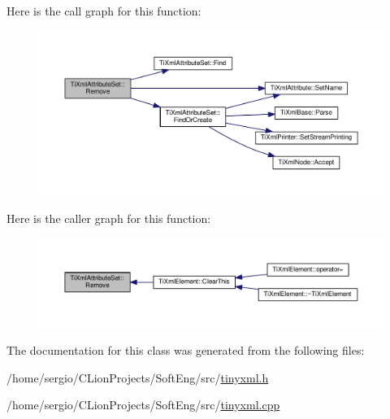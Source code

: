 Here is the call graph for this function\+:\nopagebreak
\begin{figure}[H]
\begin{center}
\leavevmode
\includegraphics[width=350pt]{class_ti_xml_attribute_set_a924a73d071f2573f9060f0be57879c57_cgraph}
\end{center}
\end{figure}
Here is the caller graph for this function\+:\nopagebreak
\begin{figure}[H]
\begin{center}
\leavevmode
\includegraphics[width=350pt]{class_ti_xml_attribute_set_a924a73d071f2573f9060f0be57879c57_icgraph}
\end{center}
\end{figure}


The documentation for this class was generated from the following files\+:\begin{DoxyCompactItemize}
\item 
/home/sergio/\+C\+Lion\+Projects/\+Soft\+Eng/src/\hyperlink{tinyxml_8h}{tinyxml.\+h}\item 
/home/sergio/\+C\+Lion\+Projects/\+Soft\+Eng/src/\hyperlink{tinyxml_8cpp}{tinyxml.\+cpp}\end{DoxyCompactItemize}
